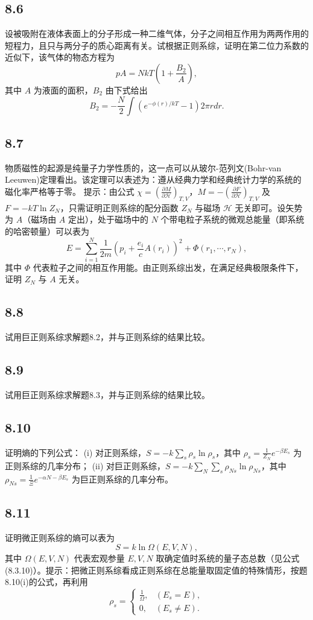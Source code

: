 \newpage
\subsection{8.6}
设被吸附在液体表面上的分子形成一种二维气体，分子之间相互作用为两两作用的短程力，且只与两分子的质心距离有关。试根据正则系综，证明在第二位力系数的近似下，该气体的物态方程为
$$pA = NkT \left( 1 + \frac{B_2}{A} \right),$$
其中 $A$ 为液面的面积，$B_2$ 由下式给出
$$B_2 = - \frac{N}{2} \int (e^{-\phi(r)/kT} - 1) 2\pi r dr.$$

\newpage
\subsection{8.7}
物质磁性的起源是纯量子力学性质的，这一点可以从玻尔-范列文(Bohr-van Leeuwen)定理看出。该定理可以表述为：遵从经典力学和经典统计力学的系统的磁化率严格等于零。
提示：由公式 $\chi = \left( \frac{\partial M}{\partial \mathcal{H}} \right)_{T,V}$，$M = -\left( \frac{\partial F}{\partial \mathcal{H}} \right)_{T,V}$ 及 $F = - k T \ln Z_N$，只需证明正则系综的配分函数 $Z_N$ 与磁场 $\mathcal{H}$ 无关即可。设矢势为 $A$（磁场由 $A$ 定出），处于磁场中的 $N$ 个带电粒子系统的微观总能量（即系统的哈密顿量）可以表为
$$E = \sum_{i=1}^{N} \frac{1}{2m} \left( p_i + \frac{e_i}{c} A(r_i) \right)^2 + \Phi(r_1, \cdots , r_N),$$
其中 $\Phi$ 代表粒子之间的相互作用能。由正则系综出发，在满足经典极限条件下，证明 $Z_N$ 与 $A$ 无关。

\newpage
\subsection{8.8}
试用巨正则系综求解题8.2，并与正则系综的结果比较。

\newpage
\subsection{8.9}
试用巨正则系综求解题8.3，并与正则系综的结果比较。

\newpage
\subsection{8.10}
证明熵的下列公式：
(i) 对正则系综，$S = -k \sum_s \rho_s \ln \rho_s$，其中 $\rho_s = \frac{1}{Z_N} e^{-\beta E_s}$ 为正则系综的几率分布；
(ii) 对巨正则系综，$S = -k \sum_{N} \sum_{s} \rho_{Ns} \ln \rho_{Ns}$，其中 $\rho_{Ns} = \frac{1}{\Xi} e^{-\alpha N - \beta E_s}$ 为巨正则系综的几率分布。

\newpage
\subsection{8.11}
证明微正则系综的熵可以表为
$$S = k \ln \Omega (E, V, N),$$
其中 $\Omega (E, V, N)$ 代表宏观参量 $E, V, N$ 取确定值时系统的量子态总数（见公式(8.3.10)）。提示：把微正则系综看成正则系综在总能量取固定值的特殊情形，按题8.10(i)的公式，再利用
$$\rho_s = 
\begin{cases} 
\frac{1}{\Omega}, & (E_s = E), \\
0, & (E_s \ne E).
\end{cases}$$

